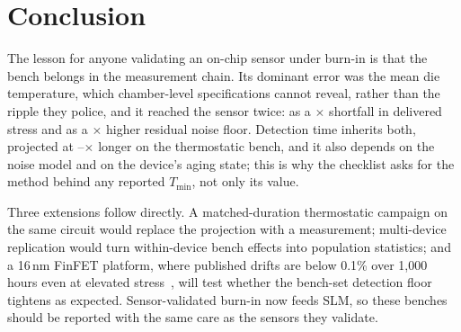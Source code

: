 \documentclass[10pt,twocolumn]{article}
\newcommand{\Tmin}{T_{\min}}
\begin{document}

\section{Conclusion}

The lesson for anyone validating an on-chip sensor under burn-in is that the bench belongs in the measurement chain. Its dominant error was the mean die temperature, which chamber-level specifications cannot reveal, rather than the ripple they police, and it reached the sensor twice: as a \vAFratio$\times$ shortfall in delivered stress and as a \vSigRawRatio$\times$ higher residual noise floor. Detection time inherits both, projected at \vPenLow--\vPenHigh$\times$ longer on the thermostatic bench, and it also depends on the noise model and on the device's aging state; this is why the checklist asks for the method behind any reported $\Tmin$, not only its value.

Three extensions follow directly. A matched-duration thermostatic campaign on the same circuit would replace the projection with a measurement; multi-device replication would turn within-device bench effects into population statistics; and a 16\,nm FinFET platform, where published drifts are below 0.1\% over 1,000 hours even at elevated stress~\cite{sobas}, will test whether the bench-set detection floor tightens as expected. Sensor-validated burn-in now feeds SLM, so these benches should be reported with the same care as the sensors they validate.
\end{document}
